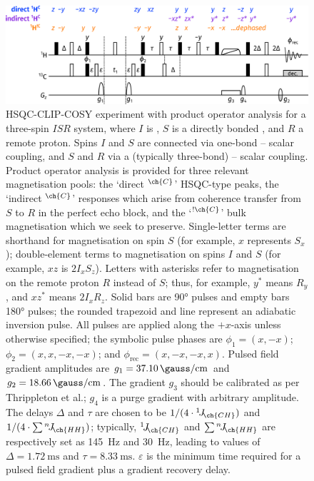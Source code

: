 \documentclass[a4paper,12pt]{article}
\newcommand{\proton}{\ch{^{1}H}}
\newcommand{\carbon}{\ch{^{13}C}}
\newcommand{\CH}{\carbon{}--\proton{}}
\newcommand{\HH}{\proton{}--\proton{}}
\newcommand{\magn}[1]{\ch{^1H}$^{\ch{#1}}$}
\newcommand{\magnnot}[1]{\ch{^1H}$^{!\ch{#1}}$}
\newcommand{\oneJ}[1]{{}^{1}\!J_{\!\ch{#1}}}
\newcommand{\nJ}[1]{{}^{n}\!J_{\!\ch{#1}}}
\begin{document}
\begin{refsection}
\begin{figure}[!ht]
    \centering
    \includegraphics[]{clip_po.png}%
    \caption[HSQC-CLIP-COSY experiment]{
        HSQC-CLIP-COSY experiment with product operator analysis for a three-spin $ISR$ system, where $I$ is \carbon{}, $S$ is a directly bonded \proton{}, and $R$ a remote proton.
        Spins $I$ and $S$ are connected via one-bond \CH{} scalar coupling, and $S$ and $R$ via a (typically three-bond) \HH{} scalar coupling.
        Product operator analysis is provided for three relevant magnetisation pools: the `direct \magn{C}' HSQC-type peaks, the `indirect \magn{C}' responses which arise from coherence transfer from $S$ to $R$ in the perfect echo block, and the `\magnnot{C}' bulk magnetisation which we seek to preserve.
        Single-letter terms are shorthand for magnetisation on spin $S$ (for example, $x$ represents $S_x$); double-element terms to magnetisation on spins $I$ and $S$ (for example, $xz$ is $2I_xS_z$).
        Letters with asterisks refer to magnetisation on the remote proton $R$ instead of $S$; thus, for example, $y^*$ means $R_y$, and $xz^*$ means $2I_xR_z$.
        Solid bars are \ang{90} pulses and empty bars \ang{180} pulses; the rounded trapezoid and line represent an adiabatic inversion pulse.
        All pulses are applied along the $+x$-axis unless otherwise specified; the symbolic pulse phases are $\phi_1 = (x, -x)$; $\phi_2 = (x, x, -x, -x)$; and $\phi_{\text{rec}} = (x, -x, -x, x)$.
        Pulsed field gradient amplitudes are $g_1 = \qty{37.10}{\gauss\per\cm}$ and $g_2 = \qty{18.66}{\gauss\per\cm}$.
        The gradient $g_3$ should be calibrated as per Thrippleton et al.\autocite{Thrippleton2003ACIE}; $g_4$ is a purge gradient with arbitrary amplitude.
        The delays $\Delta$ and $\tau$ are chosen to be $1 / (4 \cdot \oneJ{CH})$ and $1 / (4 \cdot \sum \nJ{HH})$; typically, $\oneJ{CH}$ and $\sum \nJ{HH}$ are respectively set as \qty{145}{\Hz} and \qty{30}{\Hz}, leading to values of $\Delta = \qty{1.72}{\ms}$ and $\tau = \qty{8.33}{\ms}$.
        $\varepsilon$ is the minimum time required for a pulsed field gradient plus a gradient recovery delay.
    }
    \label{fig:hsqcc_clip_po}
\end{figure}


\end{refsection}
\end{document}
